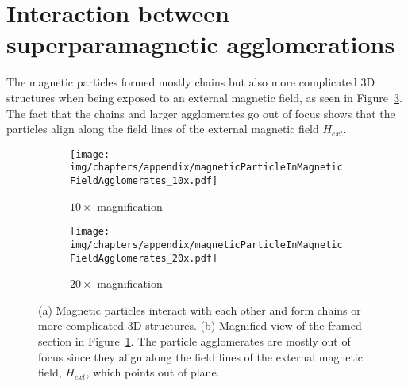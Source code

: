 \section{Interaction between superparamagnetic agglomerations}
The magnetic particles formed mostly chains but also more complicated 3D structures when being exposed to an external magnetic field, as seen in Figure~\ref{fig:interactionBetweenSuperparamagneticAgglomerates}. The fact that the chains and larger agglomerates go out of focus shows that the particles align along the field lines of the external magnetic field $H_{ext}$.

\begin{figure}[htb]
	\centering
	\begin{subfigure}[b]{0.48\textwidth}
		\texttt{[image: img/chapters/appendix/magneticParticleInMagneticFieldAgglomerates\_10x.pdf]}
		\caption{$10\times$ magnification}
		\label{fig:interactionBetweenSuperparamagneticAgglomerates10x}
	\end{subfigure}
	\hfill
	\begin{subfigure}[b]{0.48\textwidth}
		\texttt{[image: img/chapters/appendix/magneticParticleInMagneticFieldAgglomerates\_20x.pdf]}
		\label{fig:interactionBetweenSuperparamagneticAgglomerates20x}
		\caption{$20\times$ magnification}
	\end{subfigure}
	\label{fig:interactionBetweenSuperparamagneticAgglomerates}
	\caption[Interaction between magnetic particle agglomerates]{(a) Magnetic particles interact with each other and form chains or more complicated 3D structures. (b) Magnified view of the framed section in Figure~\ref{fig:interactionBetweenSuperparamagneticAgglomerates10x}. The particle agglomerates are mostly out of focus since they align along the field lines of the external magnetic field, $H_{ext}$, which points out of plane.}
\end{figure}

%

\cleardoublepage
